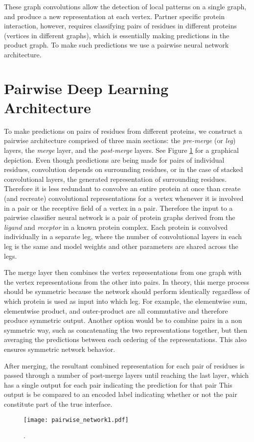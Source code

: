 These graph convolutions allow the detection of local patterns on a single graph, and produce a new representation at each vertex.
Partner specific protein interaction, however, requires classifying pairs of residues in different proteins (vertices in different graphs), which is essentially making predictions in the product graph. To make such predictions we use a pairwise neural network architecture.

\section{Pairwise Deep Learning Architecture}
To make predictions on pairs of residues from different proteins, we construct a pairwise architecture comprised of three main sections: the \textit{pre-merge} (or \textit{leg}) layers, the \textit{merge} layer, and the \textit{post-merge} layers.
See Figure \ref{fig:pairwise_arch1} for a graphical depiction.
Even though predictions are being made for pairs of individual residues, convolution depends on surrounding residues, or in the case of stacked convolutional layers, the generated representation of surrounding residues.
Therefore it is less redundant to convolve an entire protein at once than create (and recreate) convolutional representations for a vertex whenever it is involved in a pair or the receptive field of a vertex in a pair.
Therefore the input to a pairwise classifier neural network is a pair of protein graphs derived from the \textit{ligand} and \textit{receptor} in a known protein complex.
Each protein is convolved individually in a separate leg, where the number of convolutional layers in each leg is the same and model weights and other parameters are shared across the legs.

The merge layer then combines the vertex representations from one graph with the vertex representations from the other into pairs. 
In theory, this merge process should be symmetric because the network should perform identically regardless of which protein is used as input into which leg.
For example, the elementwise sum, elementwise product, and outer-product are all commutative and therefore produce symmetric output.
Another option would be to combine pairs in a non symmetric way, such as concatenating the two representations together, but then averaging the predictions between each ordering of the representations.
This also ensures symmetric network behavior.

After merging, the resultant combined representation for each pair of residues is passed through a number of post-merge layers until reaching the last layer, which has a single output for each pair indicating the prediction for that pair
This output is be compared to an encoded label indicating whether or not the pair constitute part of the true interface. 

\begin{figure}
	\centering
	\texttt{[image: pairwise\_network1.pdf]}
	\caption{.}
	\label{fig:pairwise_arch1}
\end{figure}


